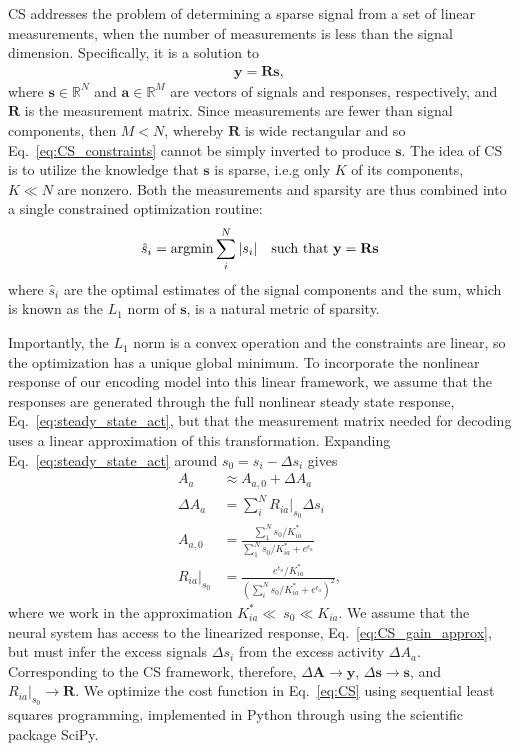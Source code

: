 \documentclass[9pt,twocolumn,twoside,lineno]{pnas-new}
\begin{document}
CS addresses the problem of determining a sparse signal from a set of linear measurements, when the number of measurements is less than the signal dimension. Specifically, it is a solution to 
\begin{align}
\mathbf y = \mathbf R\mathbf s,
\label{eq:CS_constraints}
\end{align} where $\mathbf s \in \mathbb{R}^N$ and $\mathbf a\in \mathbb{R}^M$ are vectors of signals and responses, respectively, and $\mathbf R$ is the measurement matrix. Since measurements are fewer than signal components, then $M < N$, whereby $\mathbf R$ is wide rectangular and so Eq.~\ref{eq:CS_constraints} cannot be simply inverted to produce $\mathbf s$. The idea of CS is to utilize the knowledge that $\mathbf s$ is sparse, i.e.g only $K$ of its components, $K \ll N$ are nonzero. Both the measurements and sparsity are thus combined into a single constrained optimization routine:
\begin{align}
\hat s_i = \textup{argmin} \sum_i^N |s_i| \quad \textup{such that } \mathbf y = \mathbf R\mathbf s
\label{eq:CS}
\end{align}
where $\hat s_i$ are the optimal estimates of the signal components and the sum, which is known as the $L_1$ norm of $\mathbf s$, is a natural metric of sparsity. 

Importantly, the $L_1$ norm is a convex operation and the constraints are linear, so the optimization has a unique global minimum. To incorporate the nonlinear response of our encoding model into this linear framework, we assume that the responses are generated through the full nonlinear steady state response, Eq.~\ref{eq:steady_state_act}, but that the measurement matrix needed for decoding uses a linear approximation of this transformation.  Expanding Eq.~\ref{eq:steady_state_act} around $s_0 = s_i - \Delta s_i$ gives
\begin{align}
A_a &\approx A_{a, 0} + \Delta A_a \label{eq:CS_act_approx} \\
\Delta A_a &= \sum_i^NR_{ia}\big|_{s_0}\Delta s_i \label{eq:CS_dAct_approx}\\
A_{a, 0} &= \frac{\sum_1^N s_0/K_{ia}^*}{\sum_1^N s_0/K_{ia}^* + e^{\epsilon_a}} \label{eq:CS_act0_approx} \\
R_{ia}\big|_{s_0} &=  \frac{e^{\epsilon_a}/K_{ia}^*}{(\sum_i^Ns_0/K_{ia}^* + e^{\epsilon_a})^2},
\label{eq:CS_gain_approx}
\end{align}
where we work in the approximation $K^*_{ia} \ll~s_0 \ll K_{ia}$. We assume that the neural system has access to the linearized response, Eq.~\ref{eq:CS_gain_approx}, but must infer the excess signals $\Delta s_i$ from the excess activity $\Delta A_a$. Corresponding to the CS framework, therefore, $\Delta \mathbf {A} \rightarrow \mathbf y$, $\Delta \mathbf s \rightarrow \mathbf s$, and $R_{ia}\big|_{s_0} \rightarrow \mathbf R$. We optimize the cost function in Eq.~\ref{eq:CS} using sequential least squares programming, implemented in Python through using the scientific package SciPy.
\end{document}
